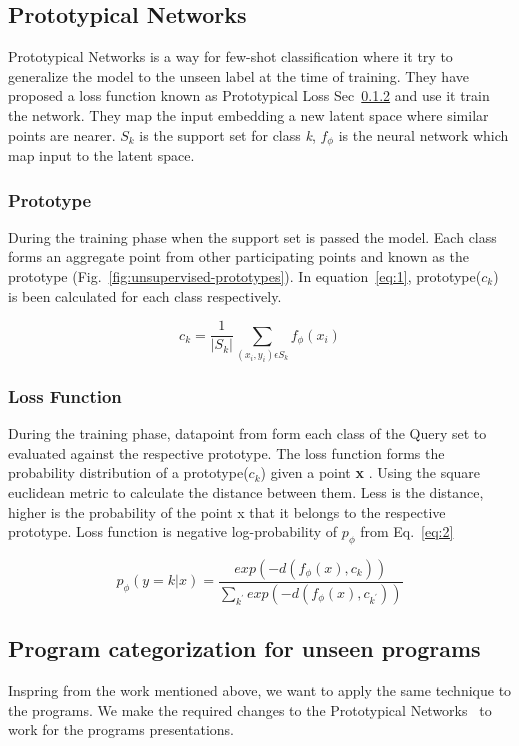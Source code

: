 \subsection{Prototypical Networks}
Prototypical Networks is a way for few-shot classification where it try to generalize the model to the unseen label at the time of training. They have proposed a loss function known as Prototypical Loss Sec~\ref{sec:algo:proto:loss} and use it train the network. They map the input embedding a new latent space where similar points are nearer. $S_{k}$ is the support set for class \textit{k}, $f_{\phi}$ is the neural network which map input to the latent space.

\subsubsection{Prototype}
During the training phase when the support set is passed the model. Each class forms an aggregate point from other participating points and known as the prototype (Fig.~\ref{fig:unsupervised-prototypes}). In equation~\ref{eq:1}, prototype($c_{k}$) is been calculated for each class respectively. 

 
\begin{equation} \label{eq:1}
c_{k} = \frac{1}{|S_{k}|}  \sum_{(x_{i},y_{i}) \epsilon S_{k}}  f_{ \phi }(x_{i})
\end{equation}

\subsubsection{Loss Function}\label{sec:algo:proto:loss}
During the training phase, datapoint from form each class of the Query set to evaluated against the respective prototype. The loss function forms the probability distribution of a prototype($c_{k}$) given a point \textbf{x} . Using the square euclidean metric to calculate the distance between them. Less is the distance, higher  is the probability of the point x that it belongs to the respective prototype. Loss function is negative log-probability of $p_{\phi}$ from Eq.~\ref{eq:2} %

\begin{equation}\label{eq:2}
p_{ \phi }(y = k | x) =  \frac{exp(-d(f_{\phi}(x), c_{k}))}{\sum_{k^{'} }exp(-d(f_{\phi}(x), c_{k^{'}}))} 
\end{equation}

\subsection{Program categorization for unseen programs}
Inspring from the work mentioned above, we want to apply the same technique to the programs. We make the required changes to the Prototypical Networks~\cite{protonet:NIPS2017} to work for the programs presentations.  

